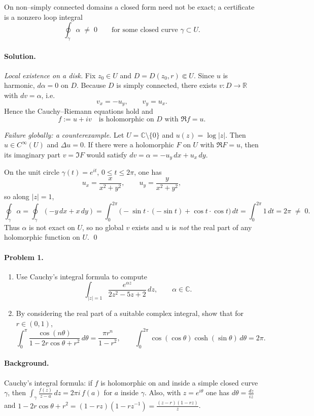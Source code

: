 \documentclass[11pt,a4paper]{article}
\theoremstyle{definition}
\theoremstyle{definition}
\theoremstyle{plain}
\theoremstyle{remark}
\begin{document}
\smallskip
On non–simply connected domains a closed form need not be exact; a certificate is a nonzero loop integral
\[
\oint_\gamma \alpha \;\neq\; 0
\qquad\text{for some closed curve }\gamma\subset U.
\]

\medskip
\paragraph{Solution.}

\emph{Local existence on a disk.}
Fix $z_0\in U$ and $D=D(z_0,r)\Subset U$.
Since $u$ is harmonic, $d\alpha=0$ on $D$. Because $D$ is simply connected,
there exists $v:D\to\mathbb R$ with $dv=\alpha$, i.e.
\[
v_x=-u_y, \qquad v_y=u_x.
\]
Hence the Cauchy–Riemann equations hold and
\[
f:=u+iv \quad\text{is holomorphic on } D \text{ with } \Re f=u.
\]

\medskip
\emph{Failure globally: a counterexample.}
Let $U=\mathbb C\setminus\{0\}$ and $u(z)=\log|z|$. Then $u\in C^\infty(U)$ and $\Delta u=0$.
If there were a holomorphic $F$ on $U$ with $\Re F=u$, then its imaginary part $v=\Im F$
would satisfy $dv=\alpha=-u_y\,dx+u_x\,dy$.

\smallskip
On the unit circle $\gamma(t)=e^{it}$, $0\le t\le 2\pi$, one has
\[
u_x=\frac{x}{x^2+y^2}, \qquad u_y=\frac{y}{x^2+y^2},
\]
so along $|z|=1$,
\[
\oint_{\gamma}\alpha
=\oint_{\gamma}(-y\,dx+x\,dy)
=\int_0^{2\pi}\!\!\big(-\sin t\cdot(-\sin t)+\cos t\cdot\cos t\big)\,dt
=\int_0^{2\pi}\!1\,dt
=2\pi \;\neq\; 0.
\]
Thus $\alpha$ is not exact on $U$, so no global $v$ exists and $u$ is \emph{not}
the real part of any holomorphic function on $U$.
\qed

\paragraph{Problem 1.}
\begin{enumerate}[label=(\roman*)]
	\item Use Cauchy’s integral formula to compute
	\[
	\int_{|z|=1}\frac{e^{\alpha z}}{2z^{2}-5z+2}\,dz,\qquad \alpha\in\mathbb C.
	\]
	
	\item By considering the real part of a suitable complex integral, show that for $r\in(0,1)$,
	\[
	\int_{0}^{\pi}\frac{\cos(n\theta)}{1-2r\cos\theta+r^{2}}\,d\theta=\frac{\pi r^{n}}{1-r^{2}},
	\qquad
	\int_{0}^{2\pi}\cos(\cos\theta)\cosh(\sin\theta)\,d\theta=2\pi .
	\]
\end{enumerate}

\paragraph{Background.}
Cauchy’s integral formula: if $f$ is holomorphic on and inside a simple closed curve $\gamma$, then
$\displaystyle \int_\gamma \frac{f(z)}{z-a}\,dz=2\pi i\,f(a)$ for $a$ inside $\gamma$.
Also, with $z=e^{i\theta}$ one has $d\theta=\frac{dz}{iz}$ and
$1-2r\cos\theta+r^{2}=(1-rz)(1-rz^{-1})=\frac{(z-r)(1-rz)}{z}$.
\end{document}
